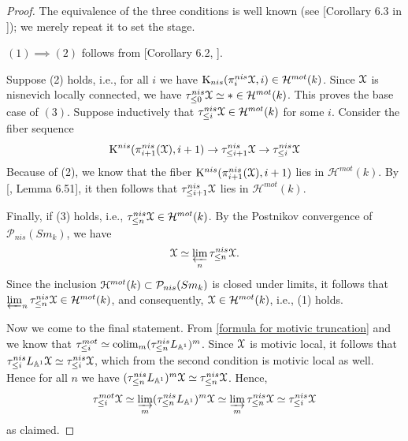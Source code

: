 \begin{proof}
The equivalence of the three conditions is well known (see [Corollary 6.3 in \cite{morel2012a1}]); we merely repeat it to set the stage. 

$(1)\implies (2)$ follows from [Corollary 6.2, \cite{morel2012a1}].   
 
Suppose (2) holds, i.e., for all $i$ we have $\mathrm{K}_{nis}(\pi_i^{nis}\EuScript{X},i)\in \mathcal{H}^{mot}(k)$. Since $\EuScript{X}$ is nisnevich locally connected, we have $\tau_{\leq 0}^{nis}\EuScript{X}\simeq *\in \mathcal{H}^{mot}(k)$. This proves the base case of $(3)$. Suppose inductively that $\tau_{\leq i}^{nis}\EuScript{X}\in \mathcal{H}^{mot}(k)$ for some $i$. Consider the fiber sequence $$\mathrm{K}^{nis}(\pi^{nis}_{i+1}(\EuScript{X}),i+1)\to \tau^{nis}_{\leq i+1}\EuScript{X}\to\tau^{nis}_{\leq i}\EuScript{X}$$
Because of (2), we know that the fiber $\mathrm{K}^{nis}(\pi^{nis}_{i+1}(\EuScript{X}),i+1)$ lies in $\mathcal{H}^{mot}(k)$. By [\cite{morel2012a1}, Lemma 6.51], it then follows that $\tau^{nis}_{\leq i+1}\EuScript{X}$ lies in $\mathcal{H}^{mot}(k)$. 

Finally, if (3) holds, i.e., $\tau^{nis}_{\leq n}\EuScript{X}\in \mathcal{H}^{mot}(k)$. By the Postnikov convergence of $\mathcal{P}_{nis}(Sm_k)$, we have $$\EuScript{X}\simeq  \varprojlim_{n}\tau^{nis}_{\leq n}\EuScript{X}.$$ Since the inclusion $\EuScript{H}^{mot}(k)\subset \mathcal{P}_{nis}(Sm_k)$ is closed under limits, it follows that $\varprojlim_{n}\tau^{nis}_{\leq n}\EuScript{X}\in \mathcal{H}^{mot}(k)$, and consequently, $\EuScript{X}\in \mathcal{H}^{mot}(k)$, i.e., (1) holds.

Now we come to the final statement. From \cref{formula for motivic truncation} and   we know that $\tau^{mot}_{\leq i}\simeq\operatorname*{colim}_{m} (\tau^{nis}_{\leq n}L_{\mathbb{A}^1})^m$. Since $\EuScript{X}$ is motivic local, it follows that $\tau^{nis}_{\leq i}L_{\mathbb{A}^1}\EuScript{X}\simeq \tau_{\leq i}^{nis}\EuScript{X} $, which from the second condition is motivic local as well. Hence for all $n$ we have  $(\tau^{nis}_{\leq n}L_{\mathbb{A}^1})^m\EuScript{X}\simeq \tau_{\leq n}^{nis}\EuScript{X}$. Hence, $$\tau^{mot}_{\leq i}\EuScript{X}\simeq\varinjlim_{m} (\tau^{nis}_{\leq n}L_{\mathbb{A}^1})^m\EuScript{X}\simeq \varinjlim_{m}\tau^{nis}_{\leq n}\EuScript{X}\simeq \tau_{\leq i}^{nis}\EuScript{X}$$ as claimed.
\end{proof}

